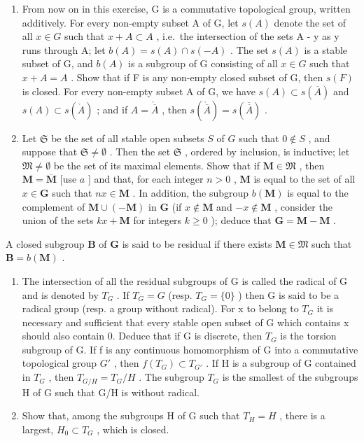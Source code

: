 \begin{enumerate}
\def\labelenumi{\alph{enumi})}
\setcounter{enumi}{1}
\item
  From now on in this exercise, G is a commutative topological group, written additively. For every non-empty subset A of G, let \(s(A)\) denote the set of all \(x \in G\) such that \(x + A \subset A\) , i.e.~the intersection of the sets A - y as y runs through A; let \(b(A) = s(A) \cap s(-A)\) . The set \(s(A)\) is a stable subset of G, and \(b(A)\) is a subgroup of G consisting of all \(x \in G\) such that \(x + A = A\) . Show that if F is any non-empty closed subset of G, then \(s(F)\) is closed. For every non-empty subset A of G, we have \(s(A) \subset s(\overline{A})\) and \(s(A) \subset s(\mathring{A})\) ; and if \(A = \mathring{\overline{A}}\) , then \(s(\mathring{\overline{A}}) = s(\overline{\overline{A}})\) .
\item
  Let \(\mathfrak{S}\) be the set of all stable open subsets \(S\) of \(G\) such that \(0 \notin S\) , and suppose that \(\mathfrak{S} \neq \emptyset\) . Then the set \(\mathfrak{S}\) , ordered by inclusion, is inductive; let \(\mathfrak{M} \neq \emptyset\) be the set of its maximal elements. Show that if \(\mathbf{M} \in \mathfrak{M}\) , then \(\mathbf{M} = \overline{\mathbf{M}}\) {[}use \(a\) {]} and that, for each integer \(n > 0\) , \(\mathbf{M}\) is equal to the set of all \(x \in \mathbf{G}\) such that \(nx \in \mathbf{M}\) . In addition, the subgroup \(b(\mathbf{M})\) is equal to the complement of \(\mathbf{M} \cup (-\mathbf{M})\) in \(\mathbf{G}\) (if \(x \notin \mathbf{M}\) and \(-x \notin \mathbf{M}\) , consider the union of the sets \(kx + \mathbf{M}\) for integers \(k \geqslant 0\) ); deduce that \(\mathbf{G} = \mathbf{M} - \mathbf{M}\) .
\end{enumerate}

A closed subgroup \(\mathbf{B}\) of \(\mathbf{G}\) is said to be residual if there exists \(\mathbf{M} \in \mathfrak{M}\) such that \(\mathbf{B} = b(\mathbf{M})\) .

\begin{enumerate}
\def\labelenumi{\alph{enumi})}
\setcounter{enumi}{3}
\item
  The intersection of all the residual subgroups of G is called the radical of G and is denoted by \(T_{G}\) . If \(T_{G}=G\) (resp. \(T_{G}=\{0\}\) ) then G is said to be a radical group (resp. a group without radical). For x to belong to \(T_{G}\) it is necessary and sufficient that every stable open subset of G which contains x should also contain 0. Deduce that if G is discrete, then \(T_{G}\) is the torsion subgroup of G. If f is any continuous homomorphism of G into a commutative topological group \(G'\) , then \(f(T_{G})\subset T_{G'}\) . If H is a subgroup of G contained in \(T_{G}\) , then \(T_{G/H}=T_{G}/H\) . The subgroup \(T_{G}\) is the smallest of the subgroups H of G such that G/H is without radical.
\item
  Show that, among the subgroups H of G such that \(T_{H} = H\) , there is a largest, \(H_{0} \subset T_{G}\) , which is closed.
\end{enumerate}

